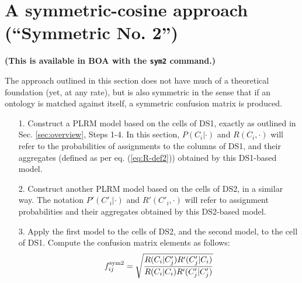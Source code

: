 \documentclass[12pt]{article}
\begin{document}
\section{A symmetric-cosine approach (``Symmetric No. 2'')}

{\bf (This is available in BOA with the {\tt sym2} command.)}

The approach outlined in this section does not have much of a
theoretical foundation (yet, at any rate), but is also symmetric in
the sense that if an ontology is matched against itself, a symmetric
confusion matrix is produced.

\begin{enumerate}
\item[1.] Construct a PLRM model based on the cells of DS1, exactly as
  outlined in Sec. \ref{sec:overview}, Steps 1-4. In this section,
  $P(C_i|\cdot)$ and $R(C_i, \cdot)$ will refer to the probabilities
  of assignments to the columns of DS1, and their aggregates (defined
  as per eq. (\ref{eq:R-def2})) obtained by this DS1-based model.


\item[2.] Construct another PLRM model based on the cells of DS2, in a
  similar way. The notation $P'(C'_i|\cdot)$ and $R'(C'_i, \cdot)$ will
  refer to assignment probabilities and their aggregates obtained by
  this DS2-based model.

\item[3.] Apply the first model to the cells of DS2, and the second
  model, to the cell of DS1. Compute the confusion matrix elements as
  follows: 
\begin{equation}
\label{eq:ag-sym2}
f^{\rm sym 2}_{ij} = \sqrt{ \frac{ R(C_i|C'_j) R'(C'_j|C_i) }{ R(C_i|C_i) R'(C'_j|C'_j)}}
\end{equation}
\end{enumerate}
\end{document}
